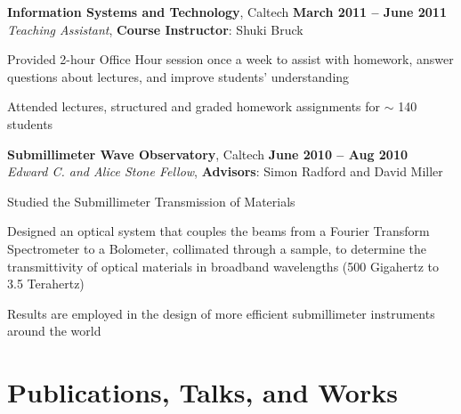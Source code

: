 \documentclass[margin,line]{resume}
\let\origsection\section%
\let\section\subsection%
\let\section\origsection%
\begin{document}
\begin{resume}
\textbf{Information Systems and Technology}, Caltech \hfill \textbf{March 2011 -- June 2011}\\
\textsl{Teaching Assistant}, \textbf{Course Instructor}: Shuki Bruck
\begin{list2}
  \item Provided 2-hour Office Hour session once a week to assist with homework, answer questions about lectures, and improve students' understanding
  \item Attended lectures, structured and graded homework assignments for $\sim$ 140 students
\end{list2}

\newpage

\textbf{Submillimeter Wave Observatory}, Caltech \hfill \textbf{June 2010 -- Aug 2010}\\
\textsl{Edward C. and Alice Stone Fellow}, \textbf{Advisors}: Simon Radford and David Miller
\begin{list2}
  \item Studied the Submillimeter Transmission of Materials
  \item Designed an optical system that couples the beams from a Fourier Transform Spectrometer to a Bolometer, collimated through a sample, to determine the transmittivity of optical materials in broadband wavelengths (500 Gigahertz to 3.5 Terahertz)
  \item Results are employed in the design of more efficient submillimeter instruments around the world
\end{list2}


\section{\mysidestyle Publications, Talks, and Works}


\end{resume}
\end{document}
